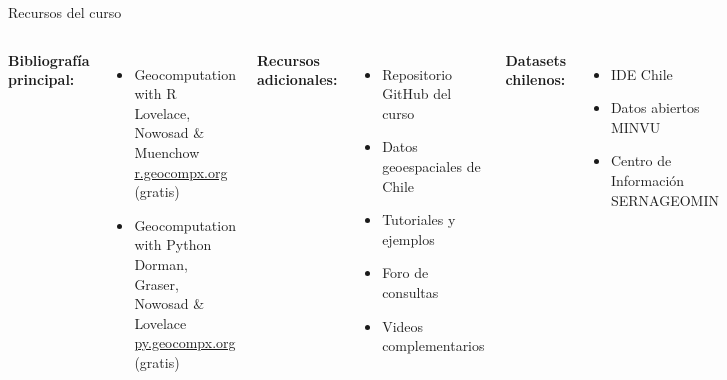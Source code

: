 \documentclass[10pt]{beamer}
\begin{document}
\begin{frame}{Recursos del curso}
    \begin{columns}
        \textbf{Bibliografía principal:}
        \begin{itemize}
            \item \textcolor{blue}{} Geocomputation with R\\
            {\small Lovelace, Nowosad \& Muenchow}\\
            {\small \url{r.geocompx.org} (gratis)}
            
            \item \textcolor{green}{} Geocomputation with Python\\
            {\small Dorman, Graser, Nowosad \& Lovelace}\\
            {\small \url{py.geocompx.org} (gratis)}
        \end{itemize}
        
        \textbf{Recursos adicionales:}
        \begin{itemize}
            \item Repositorio GitHub del curso
            \item Datos geoespaciales de Chile
            \item Tutoriales y ejemplos
            \item Foro de consultas
            \item Videos complementarios
        \end{itemize}
        
        \textbf{Datasets chilenos:}
        \begin{itemize}
            \item IDE Chile
            \item Datos abiertos MINVU
            \item Centro de Información SERNAGEOMIN
        \end{itemize}
    \end{columns}
\end{frame}
\end{document}
